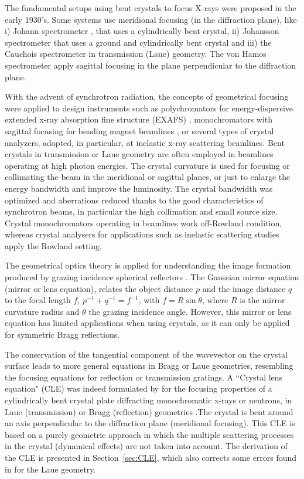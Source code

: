 \documentclass[preprint]{iucr}              %
\begin{document}
The fundamental setups using bent crystals to focus X-rays were proposed in the early 1930’s. Some systems use meridional focusing (in the diffraction plane), like i) Johann spectrometer \cite{Johann1931}, that uses a cylindrically bent crystal,  ii) Johansson spectrometer \cite{Johansson1933} that uses a ground and cylindrically bent crystal and iii) the Cauchois spectrometer \cite{cauchois1933} in transmission (Laue) geometry. The von Hamos spectrometer \cite{V.Hamos1933} apply sagittal focusing in the plane perpendicular to the diffraction plane.

With the advent of synchrotron radiation, the concepts of geometrical focusing were applied to design instruments such as polychromators for energy-dispersive extended x-ray absorption fine structure (EXAFS) \cite{Tolentino:ms0206}, monochromators with sagittal focusing for bending magnet beamlines \cite{Sparks1980}, or several types of crystal analyzers, adopted, in particular, at inelastic x-ray scattering beamlines. Bent crystals in transmission or Laue geometry are often employed in beamlines operating at high photon energies. The crystal curvature is used for focusing or collimating the beam in the meridional \cite{Suortti1988} or sagittal \cite{Zhong2001} planes, or just to enlarge the energy bandwidth and improve the luminosity. The crystal bandwidth was optimized and aberrations reduced thanks to the good characteristics of synchrotron beams, in particular the high collimation and small source size. Crystal monochromators operating in beamlines work off-Rowland condition, whereas crystal analysers for applications such as inelastic scattering studies apply the Rowland setting.

The geometrical optics theory is applied for understanding the image formation produced by grazing incidence spherical reflectors \cite{KB1948}. The Gaussian mirror equation (mirror or lens equation), relates the object distance $p$ and the image distance $q$ to the focal length $f$, $p^{-1}+q^{-1}=f^{-1}$, with $f=R \sin\theta$, where $R$ is the mirror curvature radius and $\theta$ the grazing incidence angle. However, this mirror or lens equation has limited applications when using crystals, as it can only be applied for symmetric Bragg reflections.

The conservation of the tangential component of the wavevector on the crystal surface leads to more general equations in Bragg or Laue geometries, resembling the focusing equations for reflection or transmission gratings.
A ``Crystal lens equation" (CLE) was indeed formulated by \cite{CK} for the focusing properties of a cylindrically bent crystal plate diffracting monochromatic x-rays or neutrons, in Laue (transmission) or Bragg (reflection) geometries .The crystal is bent around an axis perpendicular to the diffraction plane (meridional focusing). This CLE is based on a purely geometric approach in which the multiple scattering processes in the crystal (dynamical effects) are not taken into account. 
The derivation of the CLE is presented in Section~\ref{sec:CLE}, which also corrects
some errors found in \cite{CK} for the Laue geometry.
\end{document}
